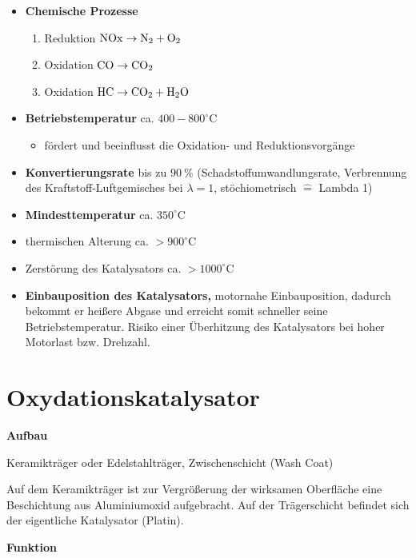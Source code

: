 \begin{itemize}
\item
  \textbf{Chemische Prozesse}

  \begin{enumerate}
  \item
    Reduktion $\ce{NOx} \to \ce{N2 + O2}$
  \item
    Oxidation $\ce{CO} \to \ce{CO2}$
  \item
    Oxidation $\ce{HC} \to \ce{CO2 + H2O}$
  \end{enumerate}
\item
  \textbf{Betriebstemperatur} ca. $400 - 800^\circ\text{C}$

  \begin{itemize}
  \item
    fördert und beeinflusst die Oxidation- und Reduktionsvorgänge
  \end{itemize}
\item
  \textbf{Konvertierungsrate} bis zu $90~\%$
  (Schadstoffumwandlungsrate, Verbrennung des Kraftstoff-Luftgemisches
  bei $\lambda = 1$, stöchiometrisch $\hat{=}$ Lambda 1)
\item
  \textbf{Mindesttemperatur} ca. $350^\circ\text{C}$
\item
  thermischen Alterung ca. $> 900^\circ\text{C}$
\item
  Zerstörung des Katalysators ca. $>1000^\circ\text{C}$
\item
  \textbf{Einbauposition des Katalysators,} motornahe Einbauposition,
  dadurch bekommt er heißere Abgase und erreicht somit schneller seine
  Betriebstemperatur. Risiko einer Überhitzung des Katalysators bei
  hoher Motorlast bzw. Drehzahl.
\end{itemize}

\section{Oxydationskatalysator}\label{oxydationskatalysator}

\textbf{Aufbau}

Keramikträger oder Edelstahlträger, Zwischenschicht (Wash Coat)

Auf dem Keramikträger ist zur Vergrößerung der wirksamen Oberfläche eine
Beschichtung aus Aluminiumoxid aufgebracht. Auf der Trägerschicht
befindet sich der eigentliche Katalysator (Platin).

\textbf{Funktion}

